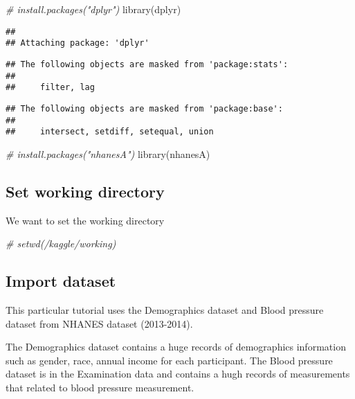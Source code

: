 \documentclass[
]{book}
\newenvironment{Shaded}{\begin{snugshade}}{\end{snugshade}}
\newcommand{\CommentTok}[1]{\textcolor[rgb]{0.56,0.35,0.01}{\textit{#1}}}
\newcommand{\FunctionTok}[1]{\textcolor[rgb]{0.00,0.00,0.00}{#1}}
\newcommand{\NormalTok}[1]{#1}
\begin{document}
\begin{Shaded}
\begin{Highlighting}[]
\CommentTok{\# install.packages("dplyr")}
\FunctionTok{library}\NormalTok{(dplyr)}
\end{Highlighting}
\end{Shaded}

\begin{verbatim}
## 
## Attaching package: 'dplyr'
\end{verbatim}

\begin{verbatim}
## The following objects are masked from 'package:stats':
## 
##     filter, lag
\end{verbatim}

\begin{verbatim}
## The following objects are masked from 'package:base':
## 
##     intersect, setdiff, setequal, union
\end{verbatim}

\begin{Shaded}
\begin{Highlighting}[]
\CommentTok{\# install.packages("nhanesA")}
\FunctionTok{library}\NormalTok{(nhanesA)}
\end{Highlighting}
\end{Shaded}

\hypertarget{set-working-directory}{%
\subsection{Set working directory}\label{set-working-directory}}

We want to set the working directory

\begin{Shaded}
\begin{Highlighting}[]
\CommentTok{\# setwd(\textquotesingle{}/kaggle/working\textquotesingle{})}
\end{Highlighting}
\end{Shaded}

\hypertarget{import-dataset}{%
\subsection{Import dataset}\label{import-dataset}}

This particular tutorial uses the Demographics dataset and Blood pressure dataset from NHANES dataset (2013-2014).

The Demographics dataset contains a huge records of demographics information such as gender, race, annual income for each participant. The Blood pressure dataset is in the Examination data and contains a hugh records of measurements that related to blood pressure measurement.
\end{document}
